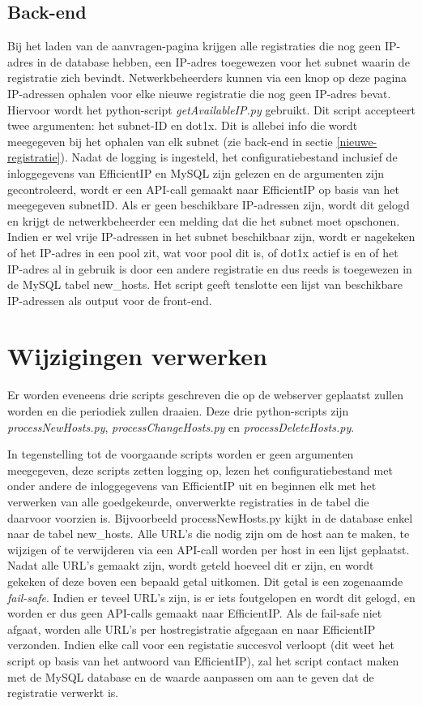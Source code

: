 \subsection{Back-end}
Bij het laden van de aanvragen-pagina krijgen alle registraties die nog geen IP-adres in de database hebben, een IP-adres toegewezen voor het subnet waarin de registratie zich bevindt.
Netwerkbeheerders kunnen via een knop op deze pagina IP-adressen ophalen voor elke nieuwe registratie die nog geen IP-adres bevat.
Hiervoor wordt het python-script \textit{getAvailableIP.py} gebruikt. Dit script accepteert twee argumenten: het subnet-ID en dot1x. Dit is allebei info die wordt meegegeven bij het ophalen van elk subnet (zie back-end in sectie \ref{nieuwe-registratie}). Nadat de logging is ingesteld, het configuratiebestand inclusief de inloggegevens van EfficientIP en MySQL zijn gelezen en de argumenten zijn gecontroleerd, wordt er een API-call gemaakt naar EfficientIP op basis van het meegegeven subnetID. Als er geen beschikbare IP-adressen zijn, wordt dit gelogd en krijgt de netwerkbeheerder een melding dat die het subnet moet opschonen.
Indien er wel vrije IP-adressen in het subnet beschikbaar zijn, wordt er nagekeken of het IP-adres in een pool zit, wat voor pool dit is, of dot1x actief is en of het IP-adres al in gebruik is door een andere registratie en dus reeds is toegewezen in de MySQL tabel new\_hosts. Het script geeft tenslotte een lijst van beschikbare IP-adressen als output voor de front-end.

\section{Wijzigingen verwerken}
\label{wijzigingen-verwerken}
Er worden eveneens drie scripts geschreven die op de webserver geplaatst zullen worden en die periodiek zullen draaien.
Deze drie python-scripts zijn \textit{processNewHosts.py}, \textit{processChangeHosts.py} en \textit{processDeleteHosts.py}.

In tegenstelling tot de voorgaande scripts worden er geen argumenten meegegeven, deze scripts zetten logging op, lezen het configuratiebestand met onder andere de inloggegevens van EfficientIP uit en beginnen elk met het verwerken van alle goedgekeurde, onverwerkte registraties in de tabel die daarvoor voorzien is. Bijvoorbeeld processNewHosts.py kijkt in de database enkel naar de tabel new\_hosts.
Alle URL's die nodig zijn om de host aan te maken, te wijzigen of te verwijderen via een API-call worden per host in een lijst geplaatst.
Nadat alle URL's gemaakt zijn, wordt geteld hoeveel dit er zijn, en wordt gekeken of deze boven een bepaald getal uitkomen.
Dit getal is een zogenaamde \textit{fail-safe}. Indien er teveel URL's zijn, is er iets foutgelopen en wordt dit gelogd, en worden er dus geen API-calls gemaakt naar EfficientIP.
Als de fail-safe niet afgaat, worden alle URL's per hostregistratie afgegaan en naar EfficientIP verzonden. 
Indien elke call voor een registatie succesvol verloopt (dit weet het script op basis van het antwoord van EfficientIP), zal het script contact maken met de MySQL database en de waarde aanpassen om aan te geven dat de registratie verwerkt is.



